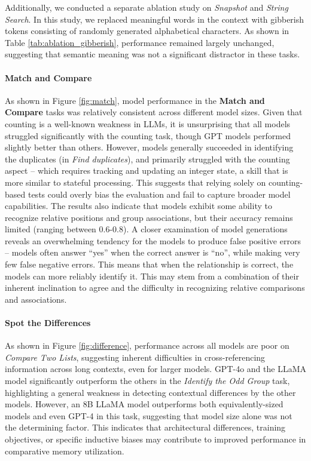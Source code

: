 Additionally, we conducted a separate ablation study on \textit{Snapshot} and \textit{String Search}. In this study, we replaced meaningful words in the context with gibberish tokens consisting of randomly generated alphabetical characters. As shown in Table \ref{tab:ablation_gibberish}, performance remained largely unchanged, suggesting that semantic meaning was not a significant distractor in these tasks.






\paragraph{Match and Compare}
 As shown in Figure \ref{fig:match}, model performance in the \textbf{Match and Compare} tasks was relatively consistent across different model sizes. Given that counting is a well-known weakness in LLMs, it is unsurprising that all models struggled significantly with the counting task, though GPT models performed slightly better than others. However, models generally succeeded in identifying the duplicates (in \textit{Find duplicates}), and primarily struggled with the counting aspect -- which requires tracking and updating an integer state, a skill that is more similar to stateful processing. This suggests that relying solely on counting-based tests \cite{song2024countingstars} could overly bias the evaluation and fail to capture broader model capabilities. The results also indicate that models exhibit some ability to recognize relative positions and group associations, but their accuracy remains limited (ranging between 0.6-0.8). A closer examination of model generations reveals an overwhelming tendency for the models to produce false positive errors -- models often answer “yes” when the correct answer is “no”, while making very few false negative errors. This means that when the relationship is correct, the models can more reliably identify it. This may stem from a combination of their inherent inclination to agree and the difficulty in recognizing relative comparisons and associations.



\paragraph{Spot the Differences}
As shown in Figure \ref{fig:difference}, performance across all models are poor on \textit{Compare Two Lists}, suggesting inherent difficulties in cross-referencing information across long contexts, even for larger models.  GPT-4o and the LLaMA model significantly outperform the others in the \textit{Identify the Odd Group} task, highlighting a general weakness in detecting contextual differences by the other models. However, an 8B LLaMA model outperforms both equivalently-sized models and even GPT-4 in this task, suggesting that model size alone was not the determining factor. This indicates that architectural differences, training objectives, or specific inductive biases may contribute to improved performance in comparative memory utilization.


